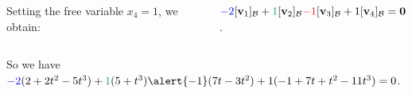 \documentclass[xcolor=dvipsnames,aspectratio=169,t]{beamer}
\begin{document}
\begin{frame}
\begin{columns}[t]
  \column{0.5\tw}
  
  \vspace*{1em}
  
  Setting the free variable $x_4=1$, we obtain:
  
  $\blue{-2}[\v_1]_\B + \green{1}[\v_2]_\B \red{-1}[\v_3]_\B + 1[\v_4]_\B = \mathbf{0}$.
  \end{columns}

  \bs

  So we have $\colorb{-2} (2+2t^2-5t^3)  +  \colorg{1}(5+t^3) \alert{-1} (7t - 3t^2)
    +1(-1 + 7t + t^2-11t^3) = 0$.
\end{frame}

% 
\end{document}

